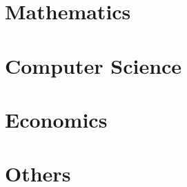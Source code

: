 



\part{Mathematics}







\part{Computer Science}



\part{Economics}



%
%
%

\part{Others}



